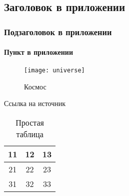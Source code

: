\section{}\label{app:_section}
\subsection{Заголовок в приложении}\label{app:_subsection}
\subsubsection{Подзаголовок в приложении}\label{app:_subsubsection}
\paragraph{Пункт в приложении}\label{app:_paragraph}

\begin{figure}[H]
    \texttt{[image: universe]}
    \caption{Космос}\label{fig:app_fig}
\end{figure}

Ссылка на источник

\begin{table}[H]
\caption{Простая таблица}\label{tab:app_tab}
\begin{tabular}{|c|c|c|}
    \hline
    11 & 12 & 13\\\hline
    21 & 22 & 23\\\hline
    31 & 32 & 33\\\hline
\end{tabular}
\end{table}
